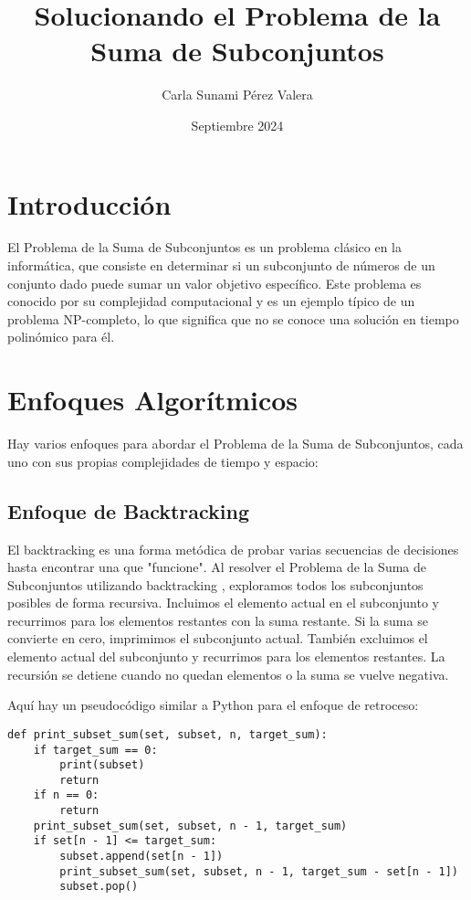 \documentclass{article}
\title{Solucionando el Problema de la Suma de Subconjuntos}
\author{Carla Sunami Pérez Valera}
\date{Septiembre 2024}
\begin{document}
\maketitle

\section{Introducción}
El Problema de la Suma de Subconjuntos es un problema clásico en la informática, que consiste en determinar si un subconjunto de números de un conjunto dado puede sumar un valor objetivo específico. Este problema es conocido por su complejidad computacional y es un ejemplo típico de un problema NP-completo, lo que significa que no se conoce una solución en tiempo polinómico para él.

\section{Enfoques Algorítmicos}
Hay varios enfoques para abordar el Problema de la Suma de Subconjuntos, cada uno con sus propias complejidades de tiempo y espacio:

\subsection{Enfoque de Backtracking }
El backtracking  es una forma metódica de probar varias secuencias de decisiones hasta encontrar una que "funcione". Al resolver el Problema de la Suma de Subconjuntos utilizando backtracking , exploramos todos los subconjuntos posibles de forma recursiva. Incluimos el elemento actual en el subconjunto y recurrimos para los elementos restantes con la suma restante. Si la suma se convierte en cero, imprimimos el subconjunto actual. También excluimos el elemento actual del subconjunto y recurrimos para los elementos restantes. La recursión se detiene cuando no quedan elementos o la suma se vuelve negativa.

Aquí hay un pseudocódigo similar a Python para el enfoque de retroceso:

\begin{verbatim}
def print_subset_sum(set, subset, n, target_sum):
    if target_sum == 0:
        print(subset)
        return
    if n == 0:
        return
    print_subset_sum(set, subset, n - 1, target_sum)
    if set[n - 1] <= target_sum:
        subset.append(set[n - 1])
        print_subset_sum(set, subset, n - 1, target_sum - set[n - 1])
        subset.pop()
\end{verbatim}
\end{document}
